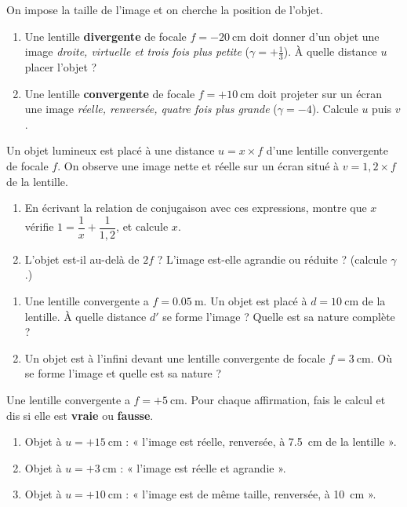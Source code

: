 \documentclass[11pt,a4paper]{article}
\begin{document}

\begin{exo}
On impose la taille de l'image et on cherche la position de l'objet.
\begin{enumerate}[label=\alph*)]
  \item Une lentille \textbf{divergente} de focale $f=-\qty{20}{\cm}$ doit donner d'un objet une image
        \emph{droite, virtuelle et trois fois plus petite} ($\gamma=+\tfrac13$). À quelle distance $u$
        placer l'objet ?
  \item Une lentille \textbf{convergente} de focale $f=+\qty{10}{\cm}$ doit projeter sur un écran une
        image \emph{réelle, renversée, quatre fois plus grande} ($\gamma=-4$). Calcule $u$ puis $v$.
\end{enumerate}
\end{exo}

\begin{exo}
Un objet lumineux est placé à une distance $u=x\times f$ d'une lentille convergente de focale $f$. On
observe une image nette et réelle sur un écran situé à $v=1{,}2\times f$ de la lentille.
\begin{enumerate}[label=\alph*)]
  \item En écrivant la relation de conjugaison avec ces expressions, montre que $x$ vérifie
        $1=\dfrac{1}{x}+\dfrac{1}{1{,}2}$, et calcule $x$.
  \item L'objet est-il au-delà de $2f$ ? L'image est-elle agrandie ou réduite ? (calcule $\gamma$.)
\end{enumerate}
\end{exo}

\begin{exo}
\begin{enumerate}[label=\alph*)]
  \item Une lentille convergente a $f=\qty{0.05}{\m}$. Un objet est placé à $d=\qty{10}{\cm}$ de la
        lentille. À quelle distance $d'$ se forme l'image ? Quelle est sa nature complète ?
  \item Un objet est à l'infini devant une lentille convergente de focale $f=\qty{3}{\cm}$. Où se
        forme l'image et quelle est sa nature ?
\end{enumerate}
\end{exo}

\begin{exo}
Une lentille convergente a $f=+\qty{5}{\cm}$. Pour chaque affirmation, fais le calcul et dis si elle
est \textbf{vraie} ou \textbf{fausse}.
\begin{enumerate}[label=\alph*)]
  \item Objet à $u=+\qty{15}{\cm}$ : « l'image est réelle, renversée, à \qty{7.5}{\cm} de la lentille ».
  \item Objet à $u=+\qty{3}{\cm}$ : « l'image est réelle et agrandie ».
  \item Objet à $u=+\qty{10}{\cm}$ : « l'image est de même taille, renversée, à \qty{10}{\cm} ».
\end{enumerate}
\end{exo}
\end{document}
